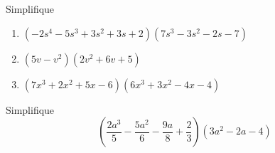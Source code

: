 	\begin{problema}
		Simplifique
		\begin{enumerate}
			\item $\left( -2s^{4}-5s^{3}+3s^{2}+3s+2 \right)\left( 7s^{3}-3s^{2}-2s-7 \right)$
			\item $\left( 5v-v^{2} \right)\left( 2v^{2}+6v+5 \right)$
			\item $\left( 7x^{3}+2x^{2}+5x-6 \right)\left( 6x^{3}+3x^{2}-4x-4 \right)$
		\end{enumerate}
		
	\end{problema}
	



	\begin{problema}
		Simplifique
		$$
		\left( \dfrac{2a^{3}}{5}-\dfrac{5a^{2}}{6}-\dfrac{9a}{8}+\dfrac{2}{3} \right)\left( 3a^{2}-2a-4 \right)
		$$
	\end{problema}
	


